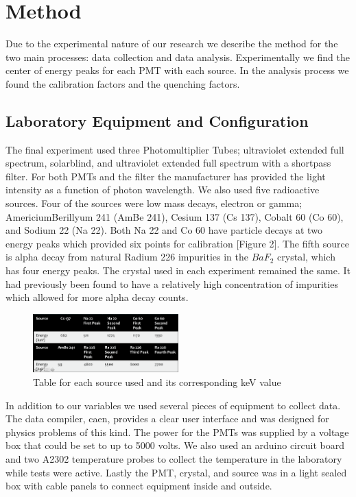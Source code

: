\documentclass{article}
\begin{document}
\section{Method}

Due to the experimental nature of our research we describe the method for the two main processes: data collection and data analysis. Experimentally we find the center of energy peaks for each PMT with each source. In the analysis process we found the calibration factors and the quenching factors. 

\subsection{Laboratory Equipment and Configuration}

The final experiment used three Photomultiplier Tubes; ultraviolet extended full spectrum, solarblind, and ultraviolet extended full spectrum with a shortpass filter. For both PMTs and the filter the manufacturer has provided the light intensity as a function of photon wavelength. We also used five radioactive sources. Four of the sources were low mass decays, electron or gamma; AmericiumBerillyum 241 (AmBe 241), Cesium 137 (Cs 137), Cobalt 60 (Co 60), and Sodium 22 (Na 22). Both Na 22 and Co 60 have particle decays at two energy peaks which provided six points for calibration [Figure 2]. The fifth source is alpha decay from natural Radium 226 impurities in the $BaF_2$ crystal, which has four energy peaks. The crystal used in each experiment remained the same. It had previously been found to have a relatively high concentration of impurities which allowed for more alpha decay counts. 

\begin{figure}
  \centering
    \includegraphics[width=0.5\textwidth]{knownkev.png}
  \caption{Table for each source used and its corresponding keV value}
  \label{fig:workflowedge}
\end{figure} 

In addition to our variables we used several pieces of equipment to collect data. The data compiler, caen, provides a clear user interface and was designed for physics problems of this kind. The power for the PMTs was supplied by a voltage box that could be set to up to 5000 volts. We also used an arduino circuit board and two A2302 temperature probes to collect the temperature in the laboratory while tests were active. Lastly the PMT, crystal, and source was in a light sealed box with cable panels to connect equipment inside and outside. 
\end{document}
